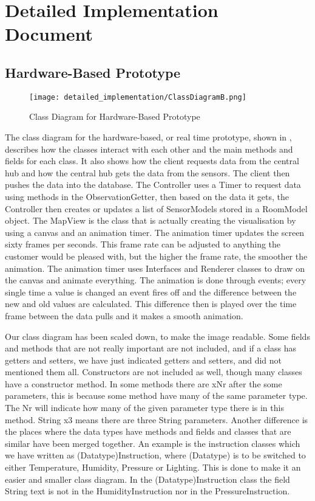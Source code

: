 \documentclass[../document]{subfiles}
\begin{document}
\section{Detailed Implementation Document}
\label{sec:detailed_implementation_document}

\subsection{Hardware-Based Prototype}

\begin{figure}[H]
\centering
\texttt{[image: detailed\_implementation/ClassDiagramB.png]}
\caption{Class Diagram for Hardware-Based Prototype}
\label{fig:ClassDiagramB}
\end{figure}

The class diagram for the hardware-based, or real time prototype, shown in , describes how the classes interact with each other and the main methods and fields for each class. It also shows how the client requests data from the central hub and how the central hub gets the data from the sensors. The client then pushes the data into the database. The Controller uses a Timer to request data using methods in the ObservationGetter, then based on the data it gets, the Controller then creates or updates a list of SensorModels stored in a RoomModel object. The MapView is the class that is actually creating the visualisation by using a canvas and an animation timer. The animation timer updates the screen sixty frames per seconds. This frame rate can be adjusted to anything the customer would be pleased with, but the higher the frame rate, the smoother the animation. The animation timer uses Interfaces and Renderer classes to draw on the canvas and animate everything. The animation is done through events; every single time a value is changed an event fires off and the difference between the new and old values are calculated. This difference then is played over the time frame between the data pulls and it makes a smooth animation. 

Our class diagram has been scaled down, to make the image readable. Some fields and methods that are not really important are not included, and if a class has getters and setters, we have just indicated getters and setters, and did not mentioned them all. Constructors are not included as well, though many classes have a constructor method. In some methods there are xNr after the some parameters, this is because some method have many of the same parameter type. The Nr will indicate how many of the given parameter type there is in this method. String x3 means there are three String parameters. Another difference is the places where the data types have methods and fields and classes that are similar have been merged together. An example is the instruction classes which we have written as (Datatype)Instruction, where (Datatype) is to be switched to either Temperature, Humidity, Pressure or Lighting. This is done to make it an easier and smaller class diagram. In the (Datatype)Instruction class the field String text is not in the HumidityInstruction nor in the PressureInstruction. 
\end{document}
